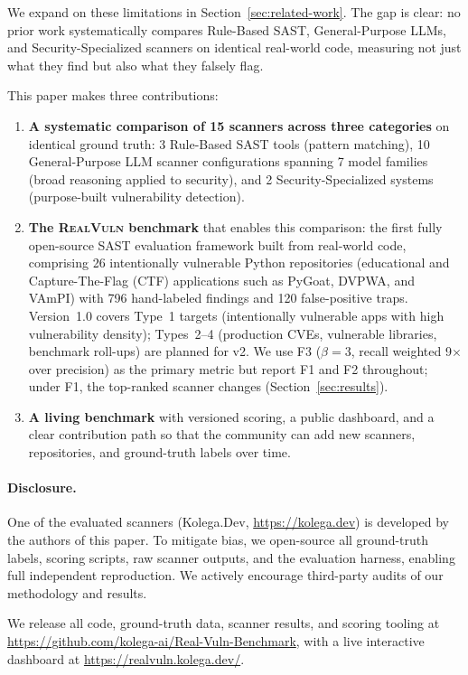 \noindent
We expand on these limitations in Section~\ref{sec:related-work}. The gap is
clear: no prior work systematically compares Rule-Based SAST, General-Purpose
LLMs, and Security-Specialized scanners on identical real-world code, measuring
not just what they find but also what they falsely flag.

This paper makes three contributions:

\begin{enumerate}
  \item \textbf{A systematic comparison of 15 scanners across three categories}
    on identical ground truth: 3 Rule-Based SAST tools (pattern matching),
    10 General-Purpose LLM scanner configurations spanning 7 model families
    (broad reasoning applied to security), and 2 Security-Specialized systems
    (purpose-built vulnerability detection).
  \item \textbf{The \textsc{RealVuln} benchmark} that enables this comparison: the
    first fully open-source SAST evaluation framework built from real-world code,
    comprising 26 intentionally vulnerable Python repositories (educational and Capture-The-Flag (CTF)
    applications such as PyGoat, DVPWA, and VAmPI) with 796
    hand-labeled findings and 120 false-positive traps. Version~1.0 covers
    Type~1 targets (intentionally vulnerable apps with high vulnerability density);
    Types~2--4 (production CVEs, vulnerable libraries, benchmark roll-ups) are
    planned for v2. We use F3 ($\beta{=}3$, recall weighted 9$\times$ over precision)
    as the primary metric but report F1 and F2 throughout; under F1, the
    top-ranked scanner changes (Section~\ref{sec:results}).
  \item \textbf{A living benchmark} with versioned scoring, a public
    dashboard, and a clear contribution path so that the community can add new
    scanners, repositories, and ground-truth labels over time.
\end{enumerate}

\paragraph{Disclosure.} One of the evaluated scanners (Kolega.Dev, \url{https://kolega.dev}) is developed by the authors of this paper. To mitigate bias, we open-source all ground-truth labels, scoring scripts, raw scanner outputs, and the evaluation harness, enabling full independent reproduction. We actively encourage third-party audits of our methodology and results.

We release all code, ground-truth data, scanner results, and scoring tooling at
\url{https://github.com/kolega-ai/Real-Vuln-Benchmark}, with a live interactive dashboard at \url{https://realvuln.kolega.dev/}.
